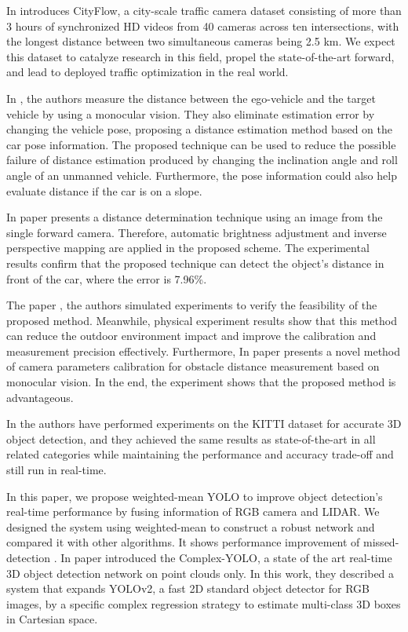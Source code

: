 In \cite{Tang2019} introduces CityFlow, a city-scale traffic camera dataset consisting of more than 3 hours of synchronized HD videos from 40 cameras across ten intersections, with the longest distance between two simultaneous cameras being 2.5 km. We expect this dataset to catalyze research in this field, propel the state-of-the-art forward, and lead to deployed traffic optimization in the real world.

In \cite{Qi2019}, the authors measure the distance between the ego-vehicle and the target vehicle by using a monocular vision. They also eliminate estimation error by changing the vehicle pose, proposing a distance estimation method based on the car pose information. The proposed technique can be used to reduce the possible failure of distance estimation produced by changing the inclination angle and roll angle of an unmanned vehicle. Furthermore, the pose information could also help evaluate distance if the car is on a slope.

In paper \cite{Wongsaree2018} presents a distance determination technique using an image from the single forward camera. Therefore, automatic brightness adjustment and inverse perspective mapping are applied in the proposed scheme. The experimental results confirm that the proposed technique can detect the object's distance in front of the car, where the error is 7.96\%.

The paper \cite{Pan2019}, the authors simulated experiments to verify the feasibility of the proposed method. Meanwhile, physical experiment results show that this method can reduce the outdoor environment impact and improve the calibration and measurement precision effectively. Furthermore, In paper \cite{Lin2014} presents a novel method of camera parameters calibration for obstacle distance measurement based on monocular vision. In the end, the experiment shows that the proposed method is advantageous.

In \cite{Simon2019a} the authors have performed experiments on the KITTI dataset for accurate 3D object detection, and they achieved the same results as state-of-the-art in all related categories while maintaining the performance and accuracy trade-off and still run in real-time.


In this paper, we propose weighted-mean YOLO to improve object detection's real-time performance by fusing information of RGB camera and LIDAR. We designed the system using weighted-mean to construct a robust network and compared it with other algorithms. It shows performance improvement of missed-detection \cite{Kim2019}. In paper \cite{Simon2019} introduced the Complex-YOLO, a state of the art real-time 3D object detection network on point clouds only. In this work, they described a system that expands YOLOv2, a fast 2D standard object detector for RGB images, by a specific complex regression strategy to estimate multi-class 3D boxes in Cartesian space. 


